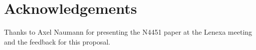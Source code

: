 \section{Acknowledgements}

Thanks to Axel Naumann for presenting the N4451 paper at the Lenexa meeting
and the feedback for this proposal.
